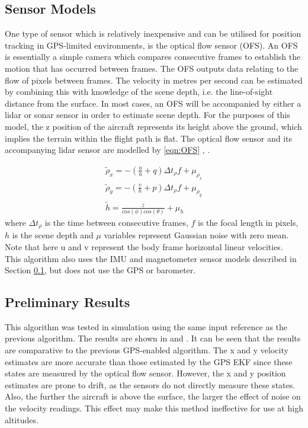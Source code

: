 \subsection{Sensor Models}\label{section:GPSSensModels}
One type of sensor which is relatively inexpensive and can be utilised for position tracking in GPS-limited environments, is the optical flow sensor (OFS). An OFS is essentially a simple camera which compares consecutive frames to establish the motion that has occurred between frames. The OFS outputs data relating to the flow of pixels between frames. The velocity in metres per second can be estimated by combining this with knowledge of the scene depth, i.e. the line-of-sight distance from the surface. In most cases, an OFS will be accompanied by either a lidar or sonar sensor in order to estimate scene depth. For the purposes of this model, the z position of the aircraft represents its height above the ground, which implies the terrain within the flight path is flat. The optical flow sensor and its accompanying lidar sensor are modelled by \eqref{eqn:OFS} \cite{Driessen2018}, \cite{Ding2010}.


\begin{equation}\label{eqn:OFS}
\begin{split}
\tilde{\rho}_{x}=-\left(\frac{u}{h}+q\right)\Delta t_{\rho}f+\mu_{\rho_{x}}\\
\tilde{\rho}_{y}=-\left(\frac{v}{h}+p\right)\Delta t_{\rho}f+\mu_{\rho_{y}}\\
\tilde{h}=\frac{z}{cos(\phi)cos(\theta)}+\mu_{h}
\end{split}
\end{equation}
where $\Delta t_{\rho}$ is the time between consecutive frames, $f$ is the focal length in pixels, $h$ is the scene depth and $\mu$ variables represent Gaussian noise with zero mean. Note that here u and v represent the body frame horizontal linear velocities.\\
This algorithm also uses the IMU and magnetometer sensor models described in Section \ref{section:GPSSensModels}, but does not use the GPS or barometer.

\subsection{Preliminary Results}

This algorithm was tested in simulation using the same input reference as the previous algorithm. The results are shown in  and . It can be seen that the results are comparative to the previous GPS-enabled algorithm. The x and y velocity estimates are more accurate than those estimated by the GPS EKF since these states are measured by the optical flow sensor. However, the x and y position estimates are prone to drift, as the sensors do not directly measure these states. Also, the further the aircraft is above the surface, the larger the effect of noise on the velocity readings. This effect may make this method ineffective for use at high altitudes.
 
